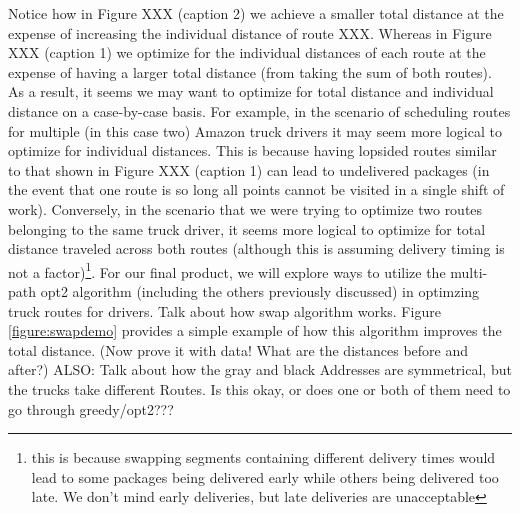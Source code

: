 \documentclass[letterpaper]{article}
\begin{document}
    Notice how in Figure XXX (caption 2) we achieve a smaller total distance at the expense of increasing the individual distance of route XXX. Whereas in Figure XXX (caption 1) we optimize for the individual distances of each route at the expense of having a larger total distance (from taking the sum of both routes). As a result, it seems we may want to optimize for total distance and individual distance on a case-by-case basis. For example, in the scenario of scheduling routes for multiple (in this case two) Amazon truck drivers it may seem more logical to optimize for individual distances. This is because having lopsided routes similar to that shown in Figure XXX (caption 1) can lead to undelivered packages (in the event that one route is so long all points cannot be visited in a single shift of work). Conversely, in the scenario that we were trying to optimize two routes belonging to the same truck driver, it seems more logical to optimize for total distance traveled across both routes (although this is assuming delivery timing is not a factor)\footnote{this is because swapping segments containing different delivery times would lead to some packages being delivered early while others being delivered too late. We don't mind early deliveries, but late deliveries are unacceptable}. For our final product, we will explore ways to utilize the multi-path opt2 algorithm (including the others previously discussed) in optimzing truck routes for drivers.  
    \newline{}\newline{}
    Talk about how swap algorithm works. Figure \ref{figure:swapdemo} provides a simple example of how this algorithm improves the total distance. (Now prove it with data! What are the distances before and after?) ALSO: Talk about how the gray and black Addresses are symmetrical, but the trucks take different Routes. Is this okay, or does one or both of them need to go through greedy/opt2???
\end{document}
